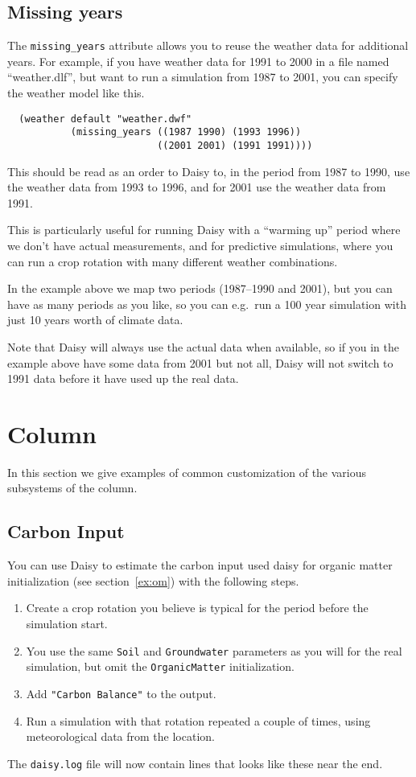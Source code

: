 \documentclass[a4paper]{article}
\begin{document}
\subsection{Missing years}

The \texttt{missing\_years} attribute allows you to reuse the weather
data for additional years.  For example, if you have weather data for
1991 to 2000 in a file named ``weather.dlf'', but want to run a
simulation from 1987 to 2001, you can specify the weather model like
this.
\begin{verbatim}
  (weather default "weather.dwf"
           (missing_years ((1987 1990) (1993 1996))
                          ((2001 2001) (1991 1991))))
\end{verbatim}
This should be read as an order to Daisy to, in the period from 1987
to 1990, use the weather data from 1993 to 1996, and for 2001 use the
weather data from 1991.

This is particularly useful for running Daisy with a ``warming up''
period where we don't have actual measurements, and for predictive
simulations, where you can run a crop rotation with many different
weather combinations.

In the example above we map two periods (1987--1990 and 2001), but you
can have as many periods as you like, so you can e.g.\ run a 100 year
simulation with just 10 years worth of climate data.

Note that Daisy will always use the actual data when available, so if
you in the example above have some data from 2001 but not all, Daisy
will not switch to 1991 data before it have used up the real data.

\section{Column}
\label{sec:column}

In this section we give examples of common customization of the
various subsystems of the column.

\subsection{Carbon Input}
\label{sec:om}

You can use Daisy to estimate the carbon input used daisy{} for
organic matter initialization (see section~\ref{ex:om}) with the
following steps.
\begin{enumerate}
\item Create a crop rotation you believe is typical for the period
  before the simulation start.
\item You use the same \texttt{Soil} and \texttt{Groundwater}
  parameters as you will for the real simulation, but omit the
  \texttt{OrganicMatter} initialization.
\item Add \texttt{"Carbon Balance"} to the output.
\item Run a simulation with that rotation repeated a couple of times,
  using meteorological data from the location.
\end{enumerate}
The \texttt{daisy.log} file will now contain lines that looks like
these near the end.
\end{document}
